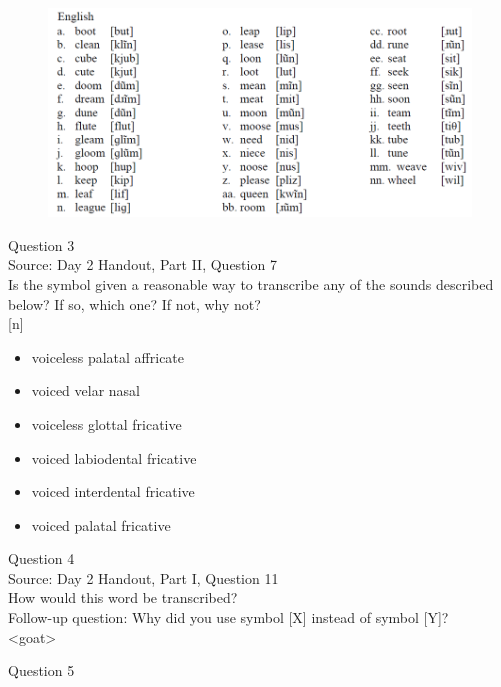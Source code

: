 \documentclass[12pt]{article}
\begin{document}
\begin{figure}[H]
\includegraphics{../images/english12.png}
\end{figure}

\newpage

{\large Question 3}\\

Source: Day 2 Handout, Part II, Question 7\\

Is the symbol given a reasonable way to transcribe any of the sounds described below? If so, which one? If not, why not?\\

{[n]}

\begin{itemize} \item voiceless palatal affricate \item voiced velar nasal \item voiceless glottal fricative \item voiced labiodental fricative \item voiced interdental fricative \item voiced palatal fricative \end{itemize}


\newpage

{\large Question 4}\\

Source: Day 2 Handout, Part I, Question 11\\

How would this word be transcribed?\\ Follow-up question: Why did you use symbol [X] instead of symbol [Y]?\\

<goat>


\newpage

{\large Question 5}\\
\end{document}
